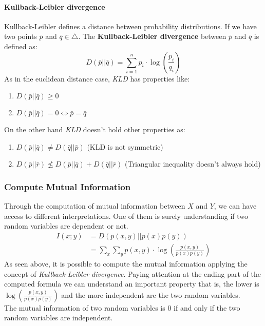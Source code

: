 \paragraph{Kullback-Leibler divergence} 
Kullback-Leibler defines a distance between probability distributions. If we have two points $\bar{p}$ and $\bar{q} \in \bigtriangleup$.
The \textbf{Kullback-Leibler divergence} between $\bar{p}$ and $\bar{q}$ is defined as:
$$D(\bar{p} || \bar{q}) = \sum_{i=1}^n p_i \cdot \log\left( \frac{p_i}{q_i}\right)$$
As in the euclidean distance case, \textit{KLD} has properties like:
\begin{enumerate}
	\item $D(\bar{p} || \bar{q}) \geq 0$
	\item $D(\bar{p} || \bar{q}) = 0 \iff \bar{p} = \bar{q}$
\end{enumerate}
On the other hand \textit{KLD} doesn't hold other properties as:
\begin{enumerate}
	\item $D(\bar{p} || \bar{q}) \neq D(\bar{q} || \bar{p})$ (KLD is not symmetric)
	\item $D(\bar{p} || \bar{r}) \nleq D(\bar{p} || \bar{q}) + D(\bar{q} || \bar{r})$ (Triangular inequality doesn't always hold) 
\end{enumerate}
\par \bigskip \noindent

\subsubsection{Compute Mutual Information}
Through the computation of mutual information between $X$ and $Y$, we can have access to different interpretations. One of them is surely understanding if two random variables are dependent or not. 
\begin{equation*}
\begin{split}
I(x;y) &= D(p(x,y)||p(x)p(y))\\
&=\sum_x \sum_y p(x,y) \cdot \log\left(\frac{p(x,y)}{p(x)p(y)} \right)
\end{split}
\end{equation*}
As seen above, it is possible to compute the mutual information applying the concept of \textit{Kullback-Leibler divergence}. Paying attention at the ending part of the computed formula we can understand an important property that is, the lower is $\log\left(\frac{p(x,y)}{p(x)p(y)} \right)$ and the more independent are the two random variables.\\
The mutual information of two random variables is 0 if and only if the two random variables are independent.

